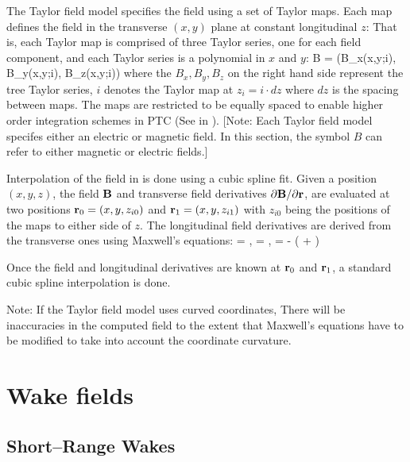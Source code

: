 The Taylor field model specifies the field using a set of Taylor maps. Each map defines
the field in the transverse $(x, y)$ plane at constant longitudinal $z$: That is, each
Taylor map is comprised of three Taylor series, one for each field component, and each
Taylor series is a polynomial in $x$ and $y$:
\Begineq
  \Bf B = (B_x(x,y;i), B_y(x,y;i), B_z(x,y;i))
\Endeq
where the $B_x, B_y, B_z$ on the right hand side represent the tree Taylor series, $i$
denotes the Taylor map at $z_i = i \cdot dz$ where $dz$ is the spacing between maps. The
maps are restricted to be equally spaced to enable higher order integration schemes in PTC
(See  in ).  [Note: Each Taylor field model
specifes either an electric or magnetic field. In this section, the symbol $B$ can refer
to either magnetic or electric fields.]

Interpolation of the field in \bmad is done using a cubic spline fit. Given a position
$(x, y, z)$, the field ${\bf B}$ and transverse field derivatives $\partial {\bf B} / \partial
{\bf r}$, are evaluated at two positions ${\bf r}_0 = (x, y, z_{i0})$ and ${\bf r}_1 = (x, y,
z_{i1})$ with $z_{i0}$ being the positions of the maps to either side of $z$.
The longitudinal field derivatives are derived from the transverse ones using Maxwell's equations:
\Begineq
   = , \qquad
   = , \qquad
   = 
    - \left(  +  \right)
\Endeq

Once the field and longitudinal derivatives are known at ${\bf r}_0$ and ${\bf r}_1$, a
standard cubic spline interpolation is done.

Note: If the Taylor field model uses curved coordinates, There will be inaccuracies in the
computed field to the extent that Maxwell's equations have to be modified to take into
account the coordinate curvature.

\section{Wake fields}
\label{s:wake.fields}

\subsection{Short--Range Wakes}
\label{s:wake.short}

